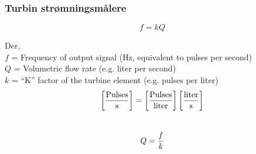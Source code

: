 \documentclass[aspectratio=169,xcolor=dvipsnames]{beamer}
\begin{document}
%
%
%
%
%
\begin{frame}
	\frametitle{Turbin strømningsmålere}
$$f = kQ$$

Der,
\\
$f$ = Frequency of output signal (Hz, equivalent to pulses per second)
\\
$Q$ = Volumetric flow rate (e.g. liter per second)
\\
$k$ = ``K'' factor of the turbine element (e.g. pulses per liter)
\\
$$\left[\hbox{Pulses} \over \hbox{s} \right] = \left[\hbox{Pulses} \over \hbox{liter} \right] \left[\hbox{liter} \over \hbox{s} \right]$$
\\
$$Q = {f \over k}$$

\end{frame}
\end{document}
